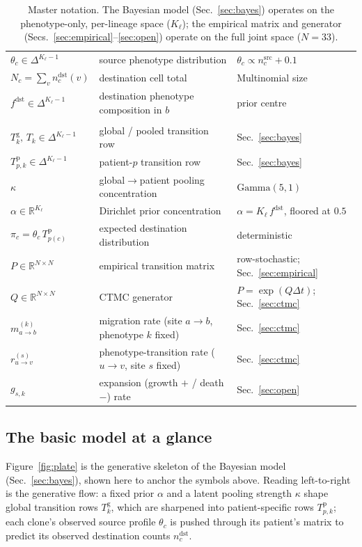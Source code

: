 \documentclass[11pt]{article}
\newcommand{\R}{\mathbb{R}}
\newcommand{\simplex}[1]{\Delta^{#1}}
\newcommand{\Tg}{T^{\mathrm{g}}}          %
\newcommand{\Tp}{T^{\mathrm{p}}}          %
\newcommand{\fdest}{f^{\mathrm{dst}}}     %
\newcommand{\ndst}{n^{\mathrm{dst}}}
\newcommand{\nsrc}{n^{\mathrm{src}}}
\newcommand{\Gam}{\mathrm{Gamma}}
\newcommand{\mig}{m}                       %
\newcommand{\tra}{r}                       %
\newcommand{\exg}{g}                       %
\begin{document}
\begin{table}[h]
\begin{tabular}{@{}l l l@{}}
$\theta_c\in\simplex{K_\ell-1}$ & source phenotype distribution & $\theta_c\propto \nsrc_c+0.1$\\
$N_c=\sum_v \ndst_c(v)$    & destination cell total           & Multinomial size\\
$\fdest\in\simplex{K_\ell-1}$ & destination phenotype composition in $b$ & prior centre\\
\addlinespace
\multicolumn{3}{@{}l}{\emph{Parameters and estimands}}\\
$\Tg_{k},\,T_{k}\in\simplex{K_\ell-1}$ & global / pooled transition row & Sec.~\ref{sec:bayes}\\
$\Tp_{p,k}\in\simplex{K_\ell-1}$ & patient-$p$ transition row     & Sec.~\ref{sec:bayes}\\
$\kappa$                   & global$\to$patient pooling concentration & $\Gam(5,1)$\\
$\alpha\in\R^{K_\ell}$     & Dirichlet prior concentration    & $\alpha=K_\ell\,\fdest$, floored at $0.5$\\
$\pi_c=\theta_c\,\Tp_{p(c)}$ & expected destination distribution & deterministic\\
$P\in\R^{N\times N}$       & empirical transition matrix      & row-stochastic; Sec.~\ref{sec:empirical}\\
$Q\in\R^{N\times N}$       & CTMC generator                   & $P=\exp(Q\Delta t)$; Sec.~\ref{sec:ctmc}\\
$\mig^{(k)}_{a\to b}$      & migration rate (site $a\!\to\! b$, phenotype $k$ fixed) & Sec.~\ref{sec:ctmc}\\
$\tra^{(s)}_{u\to v}$      & phenotype-transition rate ($u\!\to\! v$, site $s$ fixed) & Sec.~\ref{sec:ctmc}\\
$\exg_{s,k}$               & expansion (growth $+$ / death $-$) rate & Sec.~\ref{sec:open}\\
\bottomrule
\end{tabular}
\caption{Master notation. The Bayesian model (Sec.~\ref{sec:bayes}) operates on
the phenotype-only, per-lineage space ($K_\ell$); the empirical matrix and
generator (Secs.~\ref{sec:empirical}--\ref{sec:open}) operate on the full joint
space ($N=33$).}
\label{tab:notation}
\end{table}

\subsection{The basic model at a glance}

Figure~\ref{fig:plate} is the generative skeleton of the Bayesian model
(Sec.~\ref{sec:bayes}), shown here to anchor the symbols above. Reading
left-to-right is the generative flow: a fixed prior $\alpha$ and a latent pooling
strength $\kappa$ shape global transition rows $\Tg_k$, which are sharpened into
patient-specific rows $\Tp_{p,k}$; each clone's observed source profile
$\theta_c$ is pushed through its patient's matrix to predict its observed
destination counts $\ndst_c$.
\end{document}
